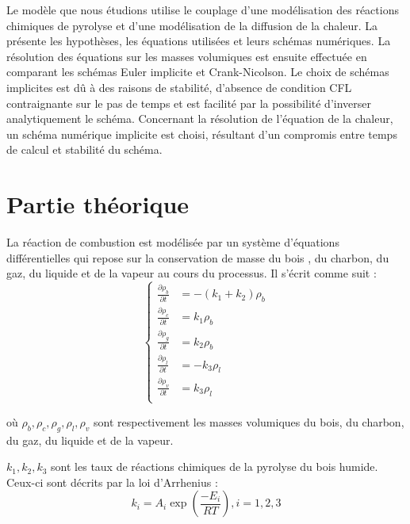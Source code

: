 \documentclass[a4paper,11pt]{article}
\begin{document}
Le modèle que nous étudions utilise le couplage d'une modélisation des réactions chimiques de pyrolyse et d'une modélisation de la diffusion de la chaleur. La  présente les hypothèses, les équations utilisées et leurs schémas numériques. La résolution des équations sur les masses volumiques est ensuite effectuée en comparant les schémas Euler implicite et Crank-Nicolson. Le choix de schémas implicites est dû à des raisons de stabilité, d'absence de condition CFL contraignante sur le pas de temps et est facilité par la possibilité d'inverser analytiquement le schéma. Concernant la résolution de l'équation de la chaleur, un schéma numérique implicite est choisi, résultant d'un compromis entre temps de calcul et stabilité du schéma.


\section{Partie théorique}\label{sec:theo}

La réaction de combustion est modélisée par un système d'équations différentielles qui repose sur la conservation de masse du bois \cite{1}, du charbon, du gaz, du liquide et de la vapeur au cours du processus. Il s'écrit comme suit :
\begin{equation}\label{eq:1}
	\left\lbrace
		\begin{aligned}
			\frac{\partial \rho_b}{\partial t} &= -(k_1 + k_2)\rho_b \\
                \frac{\partial \rho_c}{\partial t} &= k_1\rho_b\\
                \frac{\partial \rho_g}{\partial t} &= k_2\rho_b\\
                \frac{\partial \rho_l}{\partial t} &= -k_3\rho_l\\
                \frac{\partial \rho_v}{\partial t} &= k_3\rho_l\\
		\end{aligned}
	\right.
\end{equation}

où $\rho_b, \rho_c, \rho_g, \rho_l, \rho_v$ sont respectivement les masses volumiques du bois, du charbon, du gaz, du liquide et de la vapeur.

$k_1, k_2, k_3$ sont les taux de réactions chimiques de la pyrolyse du bois humide. Ceux-ci sont décrits par la loi d'Arrhenius \cite{1}: 
\begin{equation}\label{eq:2}
    k_i = A_i\exp{\left(\frac{-E_i}{RT}\right)}, i = 1,2,3
\end{equation}
\end{document}
